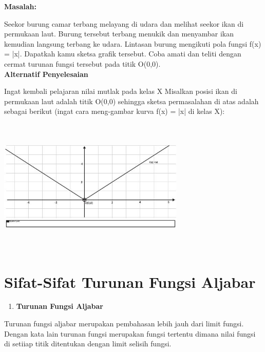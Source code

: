 \documentclass[11pt,fleqn]{book} %
\begin{document}
\noindent 
\textbf{Masalah:}

\noindent
Seekor burung camar terbang melayang di udara dan melihat seekor ikan di permukaan laut. Burung tersebut terbang menukik dan menyambar ikan kemudian langsung terbang ke udara. Lintasan burung mengikuti pola fungsi f(x) = |x|. Dapatkah kamu sketsa grafik tersebut. Coba amati dan teliti dengan cermat turunan fungsi tersebut pada titik O(0,0).\\
	 
\noindent 
\textbf{Alternatif Penyelesaian}

\noindent 
Ingat kembali pelajaran nilai mutlak pada kelas X
\noindent 
Misalkan posisi ikan di permukaan laut adalah titik O(0,0) sehingga sketsa permasalahan di atas adalah sebagai berikut (ingat cara meng-gambar kurva f(x) = |x| di kelas X):

\noindent 
\begin{center}
\noindent \includegraphics*[width=3.50in, height=2.55in, keepaspectratio=false, trim=0.00in 0.11in 0.00in 0.00in]{Pictures/TurunanFungsi6.JPG}
\end{center}


\section{Sifat-Sifat Turunan Fungsi Aljabar}

\noindent
\begin{enumerate}
\item \textbf{Turunan Fungsi Aljabar}
\end{enumerate}

\noindent 
Turunan fungsi aljabar merupakan pembahasan lebih jauh dari limit fungsi. Dengan kata lain turunan fungsi merupakan fungsi tertentu dimana nilai fungsi di setiiap titik ditentukan dengan limit selisih fungsi.
\end{document}

